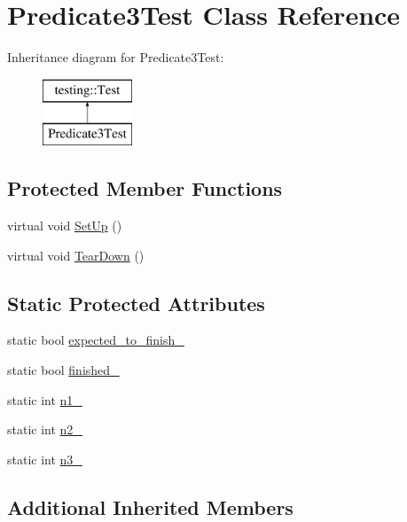 \hypertarget{class_predicate3_test}{}\section{Predicate3\+Test Class Reference}
\label{class_predicate3_test}
Inheritance diagram for Predicate3\+Test\+:\begin{figure}[H]
\begin{center}
\leavevmode
\includegraphics[height=2.000000cm]{class_predicate3_test}
\end{center}
\end{figure}
\subsection*{Protected Member Functions}
\begin{DoxyCompactItemize}
\item 
virtual void \hyperlink{class_predicate3_test_a92aad9566e0737b6739d1db14e7912be}{Set\+Up} ()
\item 
virtual void \hyperlink{class_predicate3_test_aa4dc395bded849b6e5175566d791aba7}{Tear\+Down} ()
\end{DoxyCompactItemize}
\subsection*{Static Protected Attributes}
\begin{DoxyCompactItemize}
\item 
static bool \hyperlink{class_predicate3_test_a42c11555410ee89bf6e59d39336a212c}{expected\+\_\+to\+\_\+finish\+\_\+}
\item 
static bool \hyperlink{class_predicate3_test_aa2ef0fa6aed09d872fb9ae36961b49eb}{finished\+\_\+}
\item 
static int \hyperlink{class_predicate3_test_ac232320a93f0c1e09886148a3e1929a5}{n1\+\_\+}
\item 
static int \hyperlink{class_predicate3_test_a11049ef16bcaadc8262faf7349c7676e}{n2\+\_\+}
\item 
static int \hyperlink{class_predicate3_test_afc1df6b079ffe22b87479b161d2ad2f7}{n3\+\_\+}
\end{DoxyCompactItemize}
\subsection*{Additional Inherited Members}


